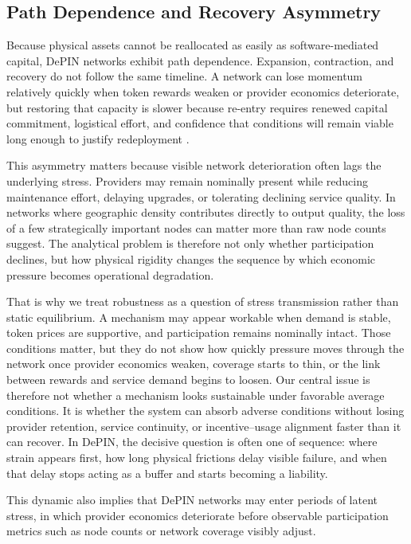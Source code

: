 \subsection{Path Dependence and Recovery Asymmetry}
Because physical assets cannot be reallocated as easily as software-mediated capital, DePIN networks exhibit path dependence. Expansion, contraction, and recovery do not follow the same timeline. A network can lose momentum relatively quickly when token rewards weaken or provider economics deteriorate, but restoring that capacity is slower because re-entry requires renewed capital commitment, logistical effort, and confidence that conditions will remain viable long enough to justify redeployment \cite{Arthur1989, Lin2024}.

This asymmetry matters because visible network deterioration often lags the underlying stress. Providers may remain nominally present while reducing maintenance effort, delaying upgrades, or tolerating declining service quality. In networks where geographic density contributes directly to output quality, the loss of a few strategically important nodes can matter more than raw node counts suggest. The analytical problem is therefore not only whether participation declines, but how physical rigidity changes the sequence by which economic pressure becomes operational degradation.

That is why we treat robustness as a question of stress transmission rather than static equilibrium. A mechanism may appear workable when demand is stable, token prices are supportive, and participation remains nominally intact. Those conditions matter, but they do not show how quickly pressure moves through the network once provider economics weaken, coverage starts to thin, or the link between rewards and service demand begins to loosen. Our central issue is therefore not whether a mechanism looks sustainable under favorable average conditions. It is whether the system can absorb adverse conditions without losing provider retention, service continuity, or incentive--usage alignment faster than it can recover. In DePIN, the decisive question is often one of sequence: where strain appears first, how long physical frictions delay visible failure, and when that delay stops acting as a buffer and starts becoming a liability.

This dynamic also implies that DePIN networks may enter periods of latent stress, in which provider economics deteriorate before observable participation metrics such as node counts or network coverage visibly adjust.

